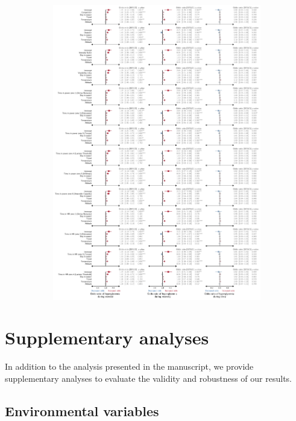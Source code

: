 \documentclass[11pt,a4paper]{article}
\begin{document}
\begin{figure}[hbtp]\ContinuedFloat%
    \begin{subfigure}{\textwidth}
        \centering
        \caption{}
        \label{fig:reg-main-hyper-full}
        \includegraphics[width=\textwidth]{figure/main/coef_env_main_binomial_hyper.pdf}
    \end{subfigure}
\end{figure}

\newpage
\section{Supplementary analyses}
In addition to the analysis presented in the manuscript, we provide supplementary analyses to evaluate the validity and robustness of our results.

\subsection{Environmental variables}
\end{document}
